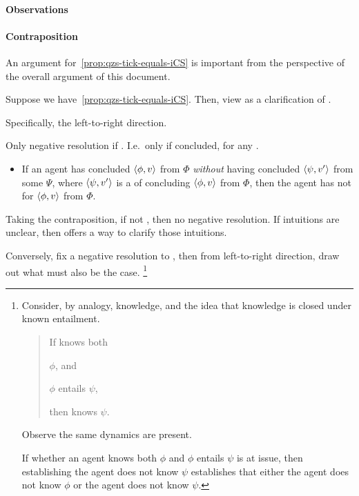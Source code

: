 \paragraph*{Observations}

\paragraph*{Contraposition}

\begin{note}[Contraposition]
  An argument for~\autoref{prop:qzs-tick-equals-iCS} is important from the perspective of the overall argument of this document.

  Suppose we have~\autoref{prop:qzs-tick-equals-iCS}.
  Then, view \iZS{} as a clarification of \qzS{}.

  Specifically, the left-to-right direction.

  Only negative resolution if \iZS{}.
  I.e.\ only if concluded, for any \requ{}.

  \begin{itemize}
  \item
    If an agent has concluded \(\langle \phi, v \rangle\) from \(\Phi\) \emph{without} having concluded \(\langle \psi, v' \rangle\) from some \(\Psi\), where \(\langle \psi, v' \rangle\) is a \requ{} of concluding \(\langle \phi, v \rangle\) from \(\Phi\), then the agent has not \csVed{} for \(\langle \phi, v \rangle\) from \(\Phi\).
  \end{itemize}

  Taking the contraposition, if not \iZS{}, then no negative resolution.
  If intuitions are unclear, then \iZS{} offers a way to clarify those intuitions.

  Conversely, fix a negative resolution to \qzS{}, then from left-to-right direction, draw out what must also be the case.%
  \footnote{
    Consider, by analogy, knowledge, and the idea that knowledge is closed under known entailment.
    \begin{quote}
      If \vAgent{} knows both
      \begin{enumerate*}[label=(\roman*)]
      \item \(\phi\), and
      \item \(\phi\) entails \(\psi\),
      \end{enumerate*}
      then \vAgent{} knows \(\psi\).
    \end{quote}
    Observe the same dynamics are present.

    If whether an agent knows both \(\phi\) and \(\phi\) entails \(\psi\) is at issue, then establishing the agent does not know \(\psi\) establishes that either the agent does not know \(\phi\) or the agent does not know \(\psi\).

}
\end{note}
